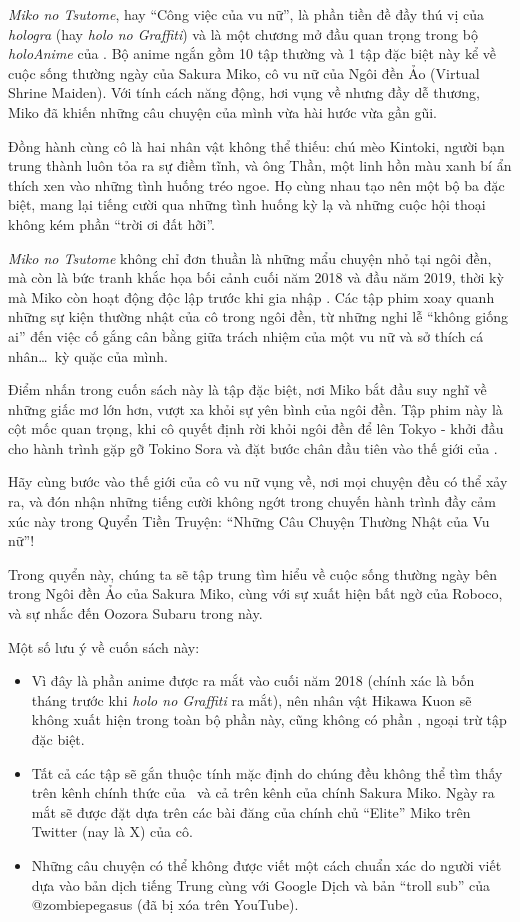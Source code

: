 \documentclass[main.tex]{subfiles}
\begin{document}
\textit{Miko no Tsutome}, hay ``Công việc của vu nữ'', là phần tiền đề đầy thú vị của \textit{hologra} (hay \textit{holo no Graffiti}) và là một chương mở đầu quan trọng trong bộ \textit{holoAnime} của \hll. Bộ anime ngắn gồm 10 tập thường và 1 tập đặc biệt này kể về cuộc sống thường ngày của Sakura Miko, cô vu nữ của Ngôi đền Ảo (Virtual Shrine Maiden). Với tính cách năng động, hơi vụng về nhưng đầy dễ thương, Miko đã khiến những câu chuyện của mình vừa hài hước vừa gần gũi.

Đồng hành cùng cô là hai nhân vật không thể thiếu: chú mèo Kintoki, người bạn trung thành luôn tỏa ra sự điềm tĩnh, và ông Thần, một linh hồn màu xanh bí ẩn thích xen vào những tình huống tréo ngoe. Họ cùng nhau tạo nên một bộ ba đặc biệt, mang lại tiếng cười qua những tình huống kỳ lạ và những cuộc hội thoại không kém phần ``trời ơi đất hỡi''.

\textit{Miko no Tsutome} không chỉ đơn thuần là những mẩu chuyện nhỏ tại ngôi đền, mà còn là bức tranh khắc họa bối cảnh cuối năm 2018 và đầu năm 2019, thời kỳ mà Miko còn hoạt động độc lập trước khi gia nhập \hll. Các tập phim xoay quanh những sự kiện thường nhật của cô trong ngôi đền, từ những nghi lễ ``không giống ai'' đến việc cố gắng cân bằng giữa trách nhiệm của một vu nữ và sở thích cá nhân\dots\ kỳ quặc của mình.

Điểm nhấn trong cuốn sách này là tập đặc biệt, nơi Miko bắt đầu suy nghĩ về những giấc mơ lớn hơn, vượt xa khỏi sự yên bình của ngôi đền. Tập phim này là cột mốc quan trọng, khi cô quyết định rời khỏi ngôi đền để lên Tokyo - khởi đầu cho hành trình gặp gỡ Tokino Sora và đặt bước chân đầu tiên vào thế giới của \hll.

Hãy cùng bước vào thế giới của cô vu nữ vụng về, nơi mọi chuyện đều có thể xảy ra, và đón nhận những tiếng cười không ngớt trong chuyến hành trình đầy cảm xúc này trong Quyển Tiền Truyện: ``Những Câu Chuyện Thường Nhật của Vu nữ''!

Trong quyển này, chúng ta sẽ tập trung tìm hiểu về cuộc sống thường ngày bên trong Ngôi đền Ảo của Sakura Miko, cùng với sự xuất hiện bất ngờ của Roboco, và sự nhắc đến Oozora Subaru trong này.

Một số lưu ý về cuốn sách này:

\begin{itemize}

  \item Vì đây là phần anime được ra mắt vào cuối năm 2018 (chính xác là bốn tháng trước khi \textit{holo no Graffiti} ra mắt), nên nhân vật Hikawa Kuon sẽ không xuất hiện trong toàn bộ phần này, cũng không có phần {}, ngoại trừ tập đặc biệt.
  \item Tất cả các tập sẽ gắn thuộc tính mặc định {} do chúng đều không thể tìm thấy trên kênh chính thức của \hll\ và cả trên kênh của chính Sakura Miko. Ngày ra mắt sẽ được đặt dựa trên các bài đăng của chính chủ ``Elite'' Miko trên Twitter (nay là X) của cô.
  \item Những câu chuyện có thể không được viết một cách chuẩn xác do người viết dựa vào bản dịch tiếng Trung cùng với Google Dịch và bản ``troll sub'' của @zombiepegasus (đã bị xóa trên YouTube).
\end{itemize}
\end{document}
